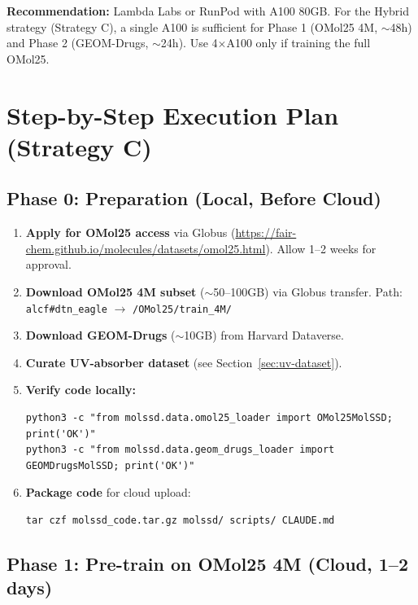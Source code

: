 \documentclass[11pt,a4paper]{article}
\begin{document}
\textbf{Recommendation:} Lambda Labs or RunPod with A100 80GB. For the Hybrid
strategy (Strategy C), a single A100 is sufficient for Phase 1 (OMol25 4M,
$\sim$48h) and Phase 2 (GEOM-Drugs, $\sim$24h). Use 4$\times$A100 only if
training the full OMol25.

\section{Step-by-Step Execution Plan (Strategy C)}

\subsection{Phase 0: Preparation (Local, Before Cloud)}

\begin{enumerate}[nosep]
    \item \textbf{Apply for OMol25 access} via Globus
          (\url{https://fair-chem.github.io/molecules/datasets/omol25.html}).
          Allow 1--2 weeks for approval.
    \item \textbf{Download OMol25 4M subset} ($\sim$50--100GB) via Globus transfer.
          Path: \texttt{alcf\#dtn\_eagle} $\to$ \texttt{/OMol25/train\_4M/}
    \item \textbf{Download GEOM-Drugs} ($\sim$10GB) from Harvard Dataverse.
    \item \textbf{Curate UV-absorber dataset} (see Section~\ref{sec:uv-dataset}).
    \item \textbf{Verify code locally:}
\begin{verbatim}
python3 -c "from molssd.data.omol25_loader import OMol25MolSSD; print('OK')"
python3 -c "from molssd.data.geom_drugs_loader import GEOMDrugsMolSSD; print('OK')"
\end{verbatim}
    \item \textbf{Package code} for cloud upload:
\begin{verbatim}
tar czf molssd_code.tar.gz molssd/ scripts/ CLAUDE.md
\end{verbatim}
\end{enumerate}

\subsection{Phase 1: Pre-train on OMol25 4M (Cloud, 1--2 days)}
\end{document}
